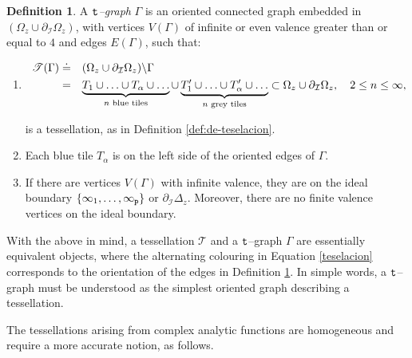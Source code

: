 \documentclass[final,3p,times]{elsarticle}
\theoremstyle{definition}
\newtheorem{definition}[theorem]{Definition}
\begin{document}
\begin{definition}
\label{def:de-t-graph}
A {\it ${\tt t}$--graph} $\Gamma$ is an oriented 
connected graph 
embedded in $(\Omega_z \cup \partial_{\mathcal{I}} \Omega_z)$, 
with vertices $V(\Gamma)$ of infinite or
even valence 
greater than or equal to $4$  
and edges $E (\Gamma)$, such that:

\begin{enumerate}[label=\roman*),leftmargin=*]
\item
\begin{equation}
\label{eq:tessellation-t-map}
\begin{array}{rl}
\mathscr{T}(\Gamma) \doteq & 
(\Omega_z \cup \partial_{\mathcal{I}} \Omega_z) \backslash \Gamma
\\
& \vspace{-.3cm}
\\ 
= &
\underbrace{
T_1 \cup \ldots \cup T_\alpha \cup \ldots  }_{ n\text{ blue tiles} }
\cup 
\underbrace{ T^\prime_1 \cup  
\ldots  \cup T^{\prime}_\alpha  \cup \ldots }_{n \text{ grey tiles}} \subset 
\Omega_z \cup \partial_{\mathcal{I}} \Omega_z, 
\ \ \ 
2 \leq n \leq \infty, 
\end{array}
\end{equation}

\noindent
is a tessellation,   
as in Definition \ref{def:de-teselacion}. 

\item
Each blue tile $T_\alpha$ is on
the left side of the oriented edges of $\Gamma$.

\item
If there are vertices $V(\Gamma)$ with 
infinite valence, they are on the ideal boundary 
$\{\infty_1,\ldots,\infty_{\tt p} \}$ or 
$\partial_{\mathcal{I}} \Delta_z$. 
Moreover, there are no finite valence vertices on the ideal boundary.
\end{enumerate}
\end{definition}

With the above in mind, a tessellation $\mathscr{T}$ and a 
${\tt t}$--graph $\Gamma$ are essentially 
equivalent objects, where the alternating 
colouring in Equation 
\eqref{teselacion} corresponds 
to the orientation of the edges in Definition 
\ref{def:de-t-graph}. 
In simple words, 
a ${\tt t}$--graph must be understood as the simplest
oriented graph describing a tessellation. 

The tessellations arising from complex analytic functions
are homogeneous and require a more accurate notion, as follows. 
\end{document}
